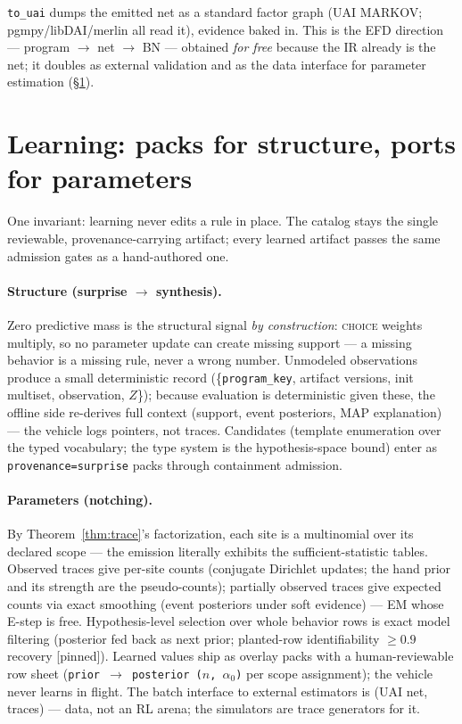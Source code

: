 \documentclass[11pt]{article}
\newcommand{\stpinned}{[\textsf{pinned}]}
\theoremstyle{plain}
\theoremstyle{definition}
\theoremstyle{remark}
\begin{document}
\texttt{to\_uai} dumps the emitted net as a standard factor graph (UAI
MARKOV; pgmpy/libDAI/merlin all read it), evidence baked in. This is
the EFD direction --- program $\to$ net $\to$ BN --- obtained \emph{for
free} because the IR already is the net; it doubles as external
validation and as the data interface for parameter estimation
(\S\ref{sec:learning}).

\section{Learning: packs for structure, ports for parameters}
\label{sec:learning}

One invariant: learning never edits a rule in place. The catalog stays
the single reviewable, provenance-carrying artifact; every learned
artifact passes the same admission gates as a hand-authored one.

\paragraph{Structure (surprise $\to$ synthesis).} Zero predictive mass
is the structural signal \emph{by construction}: \textsc{choice}
weights multiply, so no parameter update can create missing support ---
a missing behavior is a missing rule, never a wrong number. Unmodeled
observations produce a small deterministic record
(\{\texttt{program\_key}, artifact versions, init multiset,
observation, $Z$\}); because evaluation is deterministic given these,
the offline side re-derives full context (support, event posteriors,
MAP explanation) --- the vehicle logs pointers, not traces. Candidates
(template enumeration over the typed vocabulary; the type system is the
hypothesis-space bound) enter as \texttt{provenance=surprise} packs
through containment admission.

\paragraph{Parameters (notching).} By Theorem~\ref{thm:trace}'s
factorization, each site is a multinomial over its declared scope ---
the emission literally exhibits the sufficient-statistic tables.
Observed traces give per-site counts (conjugate Dirichlet updates; the
hand prior and its strength are the pseudo-counts); partially observed
traces give expected counts via exact smoothing (event posteriors under
soft evidence) --- EM whose E-step is free. Hypothesis-level selection
over whole behavior rows is exact model filtering (posterior fed back
as next prior; planted-row identifiability $\ge 0.9$ recovery
\stpinned{}). Learned values ship as overlay packs with a
human-reviewable row sheet (\texttt{prior $\to$ posterior ($n$,
$\alpha_0$)} per scope assignment); the vehicle never learns in flight.
The batch interface to external estimators is (UAI net, traces) ---
data, not an RL arena; the simulators are trace generators for it.
\end{document}

